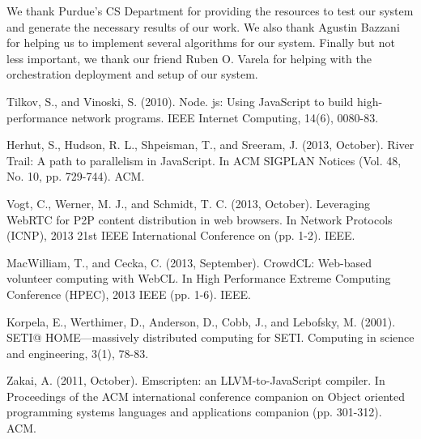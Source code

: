 \documentclass[10pt,reprint]{socc14}
\begin{document}
\acks

We thank Purdue’s CS Department for providing the resources to test our system and generate the necessary results of our work. We also thank Agustin Bazzani for helping us to implement several algorithms for our system. Finally but not less important, we thank our friend Ruben O. Varela for helping with the orchestration deployment and setup of our system.





\begin{thebibliography}{}
\softraggedright

Tilkov, S., and Vinoski, S. (2010). Node. js: Using JavaScript to build high-performance network 
programs. IEEE Internet Computing, 14(6), 0080-83.

Herhut, S., Hudson, R. L., Shpeisman, T., and Sreeram, J. (2013, October). River Trail: A path to 
parallelism in JavaScript. In ACM SIGPLAN Notices (Vol. 48, No. 10, pp. 729-744). ACM.

Vogt, C., Werner, M. J., and Schmidt, T. C. (2013, October). Leveraging WebRTC for P2P content 
distribution in web browsers. In Network Protocols (ICNP), 2013 21st IEEE International Conference 
on (pp. 1-2). IEEE.

MacWilliam, T., and Cecka, C. (2013, September). CrowdCL: Web-based volunteer computing with 
WebCL. In High Performance Extreme Computing Conference (HPEC), 2013 IEEE (pp. 1-6). IEEE.

Korpela, E., Werthimer, D., Anderson, D., Cobb, J., and Lebofsky, M. (2001). SETI@ 
HOME—massively distributed computing for SETI. Computing in science and engineering, 3(1), 
78-83.

Zakai, A. (2011, October). Emscripten: an LLVM-to-JavaScript compiler. In Proceedings of the ACM 
international conference companion on Object oriented programming systems languages and 
applications companion (pp. 301-312). ACM.



\end{thebibliography}
\end{document}
